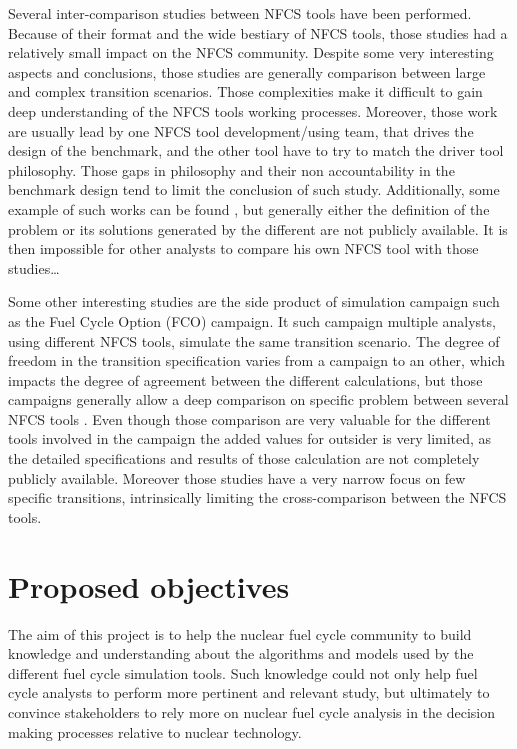 Several inter-comparison studies between NFCS tools have been performed. Because
of their format and the wide bestiary of NFCS tools, those studies had a
relatively small impact on the NFCS community. Despite some very interesting
aspects and conclusions, those studies are generally comparison between large
and complex transition scenarios. Those complexities make it difficult to gain
deep understanding of the NFCS tools working processes. Moreover, those work are
usually lead by one NFCS tool development/using team, that drives the design of
the benchmark, and the other tool have to try to match the driver tool
philosophy. Those gaps in philosophy and their non accountability in the
benchmark design tend to limit the conclusion of such study. Additionally, some
example of such works can be found \cite{IAEA - Benchmark Study on Nuclear Fuel Cycle
Transition Scenarios} \cite{MIT - Guerin}, but generally either the definition
of the problem or its solutions generated by the different are not publicly
available. It is then impossible for other analysts to compare his own NFCS tool with
those studies\ldots

Some other interesting studies are the side product of simulation campaign such
as the Fuel Cycle Option (FCO) campaign. It such campaign multiple analysts,
using different NFCS tools, simulate the same transition scenario. The degree of
freedom in the transition specification varies from a campaign to an other,
which impacts the degree of agreement between the different calculations, but
those campaigns generally allow a deep comparison on specific problem between
several NFCS tools \cite{Standardized verification of fuel cycle modeling -
B.Feng}.  Even though those comparison are very valuable for the different tools
involved in the campaign the added values for outsider is very limited, as the
detailed specifications and results of those calculation are not completely
publicly available. Moreover those studies have a very narrow focus on few
specific transitions, intrinsically limiting the cross-comparison between the
NFCS tools. 


\section{Proposed objectives}

The aim of this project is to help the nuclear fuel cycle community to build
knowledge and understanding about the algorithms and models used by the
different fuel cycle simulation tools. Such knowledge could not only help fuel
cycle analysts to perform more pertinent and relevant study, but ultimately to
convince stakeholders to rely more on nuclear fuel cycle analysis in the
decision making processes relative to nuclear technology.

